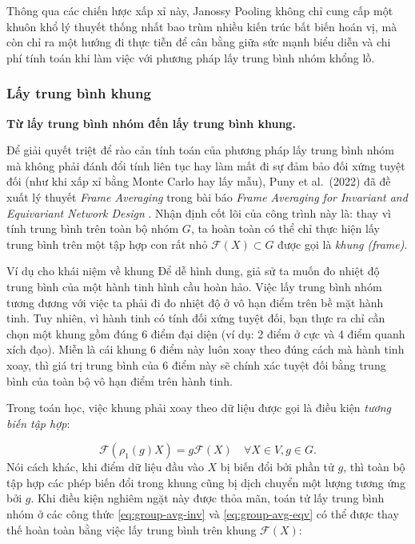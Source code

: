 Thông qua các chiến lược xấp xỉ này, Janossy Pooling không chỉ cung cấp một khuôn khổ lý thuyết thống nhất bao trùm nhiều kiến trúc bất biến hoán vị, mà còn chỉ ra một hướng đi thực tiễn để cân bằng giữa sức mạnh biểu diễn và chi phí tính toán khi làm việc với phương pháp lấy trung bình nhóm khổng lồ.

\subsubsection{Lấy trung bình khung}
\label{subsubsec:frame-averaging}

\textbf{Từ lấy trung bình nhóm đến lấy trung bình khung.}

Để giải quyết triệt để rào cản tính toán của phương pháp lấy trung bình nhóm mà không phải đánh đổi tính liên tục hay làm mất đi sự đảm bảo đối xứng tuyệt đối (như khi xấp xỉ bằng Monte Carlo hay lấy mẫu), Puny et al.\ (2022) đã đề xuất lý thuyết \textit{Frame Averaging} trong bài báo \textit{Frame Averaging for Invariant and Equivariant Network Design} \cite{puny2022frame}. Nhận định cốt lõi của công trình này là: thay vì tính trung bình trên toàn bộ nhóm $G$, ta hoàn toàn có thể chỉ thực hiện lấy trung bình trên một tập hợp con rất nhỏ $\mathcal{F}(X) \subset G$ được gọi là \textit{khung (frame)}. 

\begin{examplebox}{Ví dụ cho khái niệm về khung}
Để dễ hình dung, giả sử ta muốn đo nhiệt độ trung bình của một hành tinh hình cầu hoàn hảo. Việc lấy trung bình nhóm tương đương với việc ta phải đi đo nhiệt độ ở vô hạn điểm trên bề mặt hành tinh. Tuy nhiên, vì hành tinh có tính đối xứng tuyệt đối, bạn thực ra chỉ cần chọn một khung gồm đúng 6 điểm đại diện (ví dụ: 2 điểm ở cực và 4 điểm quanh xích đạo). Miễn là cái khung 6 điểm này luôn xoay theo đúng cách mà hành tinh xoay, thì giá trị trung bình của 6 điểm này sẽ chính xác tuyệt đối bằng trung bình của toàn bộ vô hạn điểm trên hành tinh. 
\end{examplebox}

Trong toán học, việc khung phải xoay theo dữ liệu được gọi là điều kiện \textit{tương biến tập hợp}:

\begin{equation}
    \mathcal{F}(\rho_1(g)X) = g\mathcal{F}(X) \quad \forall X \in V, g \in G.
\end{equation}
Nói cách khác, khi điểm dữ liệu đầu vào $X$ bị biến đổi bởi phần tử $g$, thì toàn bộ tập hợp các phép biến đổi trong khung cũng bị dịch chuyển một lượng tương ứng bởi $g$. Khi điều kiện nghiêm ngặt này được thỏa mãn, toán tử lấy trung bình nhóm ở các công thức \eqref{eq:group-avg-inv} và \eqref{eq:group-avg-eqv} có thể được thay thế hoàn toàn bằng việc lấy trung bình trên khung $\mathcal{F}(X)$:

